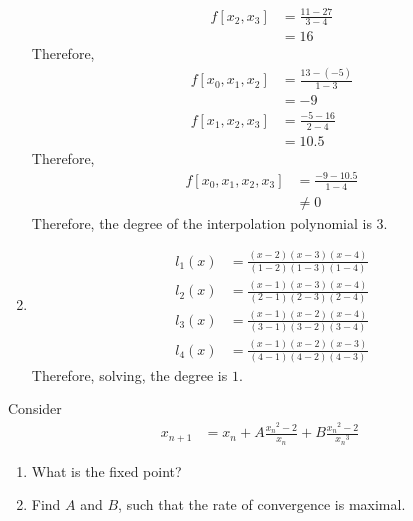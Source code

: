 \documentclass[fleqn, a4paper, 12pt, twoside, titlepage]{article}
\theoremstyle{definition}
\theoremstyle{theorem}
\begin{document}
\begin{solution}
\begin{enumerate}[leftmargin=*]
\begin{align*}
				f[x_2,x_3] &= \frac{11 - 27}{3 - 4}\\
				&= 16
			\end{align*}
			Therefore,
			\begin{align*}
				f[x_0,x_1,x_2] &= \frac{13 - (-5)}{1 - 3}\\
				&= -9\\
				f[x_1,x_2,x_3] &= \frac{-5 - 16}{2 - 4}\\
				&= 10.5
			\end{align*}
			Therefore,
			\begin{align*}
				f[x_0,x_1,x_2,x_3] &= \frac{-9 - 10.5}{1 - 4}\\
				&\neq 0
			\end{align*}
			Therefore, the degree of the interpolation polynomial is $3$.
		\item
			\begin{align*}
				l_1(x) &= \frac{(x - 2) (x - 3) (x - 4)}{(1 - 2) (1 - 3) (1 - 4)}\\
				l_2(x) &= \frac{(x - 1) (x - 3) (x - 4)}{(2 - 1) (2 - 3) (2 - 4)}\\
				l_3(x) &= \frac{(x - 1) (x - 2) (x - 4)}{(3 - 1) (3 - 2) (3 - 4)}\\
				l_4(x) &= \frac{(x - 1) (x - 2) (x - 3)}{(4 - 1) (4 - 2) (4 - 3)}
			\end{align*}
			Therefore, solving, the degree is $1$.
	\end{enumerate}
\end{solution}

\begin{question}
	Consider
	\begin{align*}
		x_{n + 1} &= x_n + A \frac{{x_n}^2 - 2}{x_n} + B \frac{{x_n}^2 - 2}{{x_n}^3}
	\end{align*}
	\begin{enumerate}
		\item What is the fixed point?
		\item Find $A$ and $B$, such that the rate of convergence is maximal.
	\end{enumerate}
\end{question}
\end{document}
